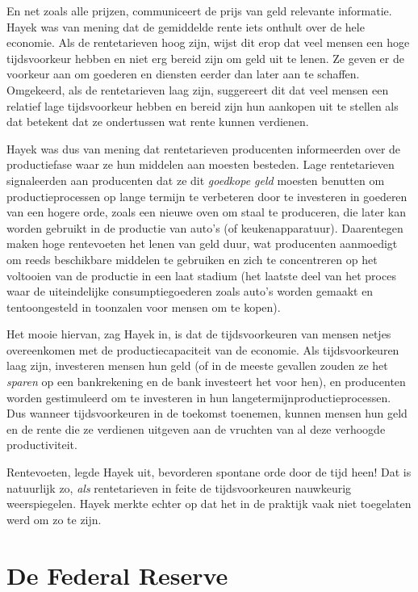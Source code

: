 \documentclass[
  a5paper,
  smalldemyvopaper,11pt,twoside,onecolumn,openright,extrafontsizes,
hidelinks]{memoir}
\begin{document}
En net zoals alle prijzen, communiceert de prijs van geld relevante
informatie. Hayek was van mening dat de gemiddelde rente iets onthult
over de hele economie. Als de rentetarieven hoog zijn, wijst dit erop
dat veel mensen een hoge tijdsvoorkeur hebben en niet erg bereid zijn om
geld uit te lenen. Ze geven er de voorkeur aan om goederen en diensten
eerder dan later aan te schaffen. Omgekeerd, als de rentetarieven laag
zijn, suggereert dit dat veel mensen een relatief lage tijdsvoorkeur
hebben en bereid zijn hun aankopen uit te stellen als dat betekent dat
ze ondertussen wat rente kunnen verdienen.

Hayek was dus van mening dat rentetarieven producenten informeerden over
de productiefase waar ze hun middelen aan moesten besteden. Lage
rentetarieven signaleerden aan producenten dat ze dit \emph{goedkope
geld} moesten benutten om productieprocessen op lange termijn te
verbeteren door te investeren in goederen van een hogere orde, zoals een
nieuwe oven om staal te produceren, die later kan worden gebruikt in de
productie van auto's (of keukenapparatuur). Daarentegen maken hoge
rentevoeten het lenen van geld duur, wat producenten aanmoedigt om reeds
beschikbare middelen te gebruiken en zich te concentreren op het
voltooien van de productie in een laat stadium (het laatste deel van het
proces waar de uiteindelijke consumptiegoederen zoals auto's worden
gemaakt en tentoongesteld in toonzalen voor mensen om te kopen).

Het mooie hiervan, zag Hayek in, is dat de tijdsvoorkeuren van mensen
netjes overeenkomen met de productiecapaciteit van de economie. Als
tijdsvoorkeuren laag zijn, investeren mensen hun geld (of in de meeste
gevallen zouden ze het \emph{sparen} op een bankrekening en de bank
investeert het voor hen), en producenten worden gestimuleerd om te
investeren in hun langetermijnproductieprocessen. Dus wanneer
tijdsvoorkeuren in de toekomst toenemen, kunnen mensen hun geld en de
rente die ze verdienen uitgeven aan de vruchten van al deze verhoogde
productiviteit.

Rentevoeten, legde Hayek uit, bevorderen spontane orde door de tijd
heen! Dat is natuurlijk zo, \emph{als} rentetarieven in feite de
tijdsvoorkeuren nauwkeurig weerspiegelen. Hayek merkte echter op dat het
in de praktijk vaak niet toegelaten werd om zo te zijn.

\section{De Federal Reserve}\label{de-federal-reserve}
\end{document}
